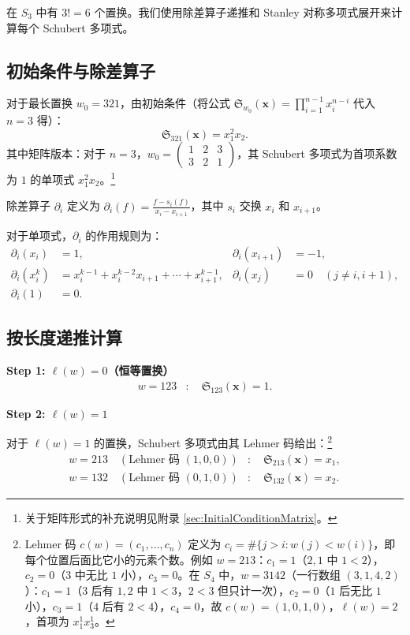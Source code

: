 \begin{Example}
\label{ex:SchubertPolynomialS3}
在 $S_3$ 中有 $3! = 6$ 个置换。我们使用除差算子递推和 Stanley 对称多项式展开来计算每个 Schubert 多项式。

\subsection*{初始条件与除差算子}

对于最长置换 $w_0 = 321$，由初始条件（将公式 $\mathfrak{S}_{w_0}(\mathbf{x}) = \prod_{i=1}^{n-1} x_i^{n-i}$ 代入 $n=3$ 得）：
\begin{equation}
\mathfrak{S}_{321}(\mathbf{x}) = x_1^{2} x_2.
\label{eq:S321-initial}
\end{equation}
其中矩阵版本：对于 $n=3$，$w_0 = \begin{pmatrix} 1 & 2 & 3 \\ 3 & 2 & 1 \end{pmatrix}$，其 Schubert 多项式为首项系数为 $1$ 的单项式 $x_1^2 x_2$。\footnote{关于矩阵形式的补充说明见附录 \cref{sec:InitialConditionMatrix}。}

除差算子 $\partial_i$ 定义为 $\partial_i(f) = \frac{f - s_i(f)}{x_i - x_{i+1}}$，其中 $s_i$ 交换 $x_i$ 和 $x_{i+1}$。

对于单项式，$\partial_i$ 的作用规则为：
\begin{align}
\partial_i(x_i) &= 1, &
\partial_i(x_{i+1}) &= -1, \\
\partial_i(x_i^k) &= x_i^{k-1} + x_i^{k-2} x_{i+1} + \cdots + x_{i+1}^{k-1}, &
\partial_i(x_j) &= 0 \quad (j \neq i, i+1), \\
\partial_i(1) &= 0.
\end{align}

\subsection*{按长度递推计算}

\bigskip
\noindent\textbf{Step 1: $\ell(w) = 0$（恒等置换）}
\begin{align}
w = 123 &: \quad \mathfrak{S}_{123}(\mathbf{x}) = 1.
\end{align}

\bigskip
\noindent\textbf{Step 2: $\ell(w) = 1$}

对于 $\ell(w) = 1$ 的置换，Schubert 多项式由其 Lehmer 码给出：\footnote{Lehmer 码 $c(w) = (c_1, \ldots, c_n)$ 定义为 $c_i = \#\{j > i : w(j) < w(i)\}$，即每个位置后面比它小的元素个数。例如 $w = 213$：$c_1 = 1$（$2,1$ 中 $1 < 2$），$c_2 = 0$（$3$ 中无比 $1$ 小），$c_3 = 0$。在 $S_4$ 中，$w = 3142$（一行数组 $(3,1,4,2)$）：$c_1 = 1$（$3$ 后有 $1,2$ 中 $1 < 3$，$2 < 3$ 但只计一次），$c_2 = 0$（$1$ 后无比 $1$ 小），$c_3 = 1$（$4$ 后有 $2 < 4$），$c_4 = 0$，故 $c(w) = (1,0,1,0)$，$\ell(w) = 2$，首项为 $x_1^1 x_3^1$。}
\begin{align}
w = 213 \quad (\text{Lehmer 码 }(1,0,0)) &: \quad \mathfrak{S}_{213}(\mathbf{x}) = x_1, \\
w = 132 \quad (\text{Lehmer 码 }(0,1,0)) &: \quad \mathfrak{S}_{132}(\mathbf{x}) = x_2.
\end{align}


\end{Example}
